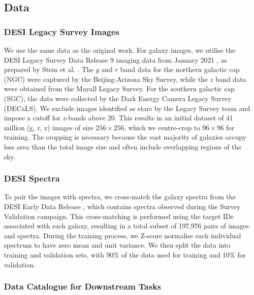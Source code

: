 \documentclass[a4paper,12pt]{article}
\begin{document}
\subsection{Data}
\label{sec:data}
\subsubsection{DESI Legacy Survey Images}
We use the same data as the original work. For galaxy images, we utilise the DESI Legacy Survey Data Release 9 imaging data from January 2021 \cite{DESI}, as prepared by Stein et al. \cite{stein}. The $g$ and $r$ band data for the northern galactic cap (NGC) were captured by the Beijing-Arizona Sky Survey, while the $z$ band data were obtained from the Mayall Legacy Survey. For the southern galactic cap (SGC), the data were collected by the Dark Energy Camera Legacy Survey (DECaLS). We exclude images identified as stars by the Legacy Survey team and impose a cutoff for $z$-bands above 20. This results in an initial dataset of 41 million (g, r, z) images of size $256 \times 256$, which we centre-crop to $96 \times 96$ for training. The cropping is necessary because the vast majority of galaxies occupy less area than the total image size and often include overlapping regions of the sky.


\subsubsection{DESI Spectra}
To pair the images with spectra, we cross-match the galaxy spectra from the DESI Early Data Release \cite{DESI2023}, which contains spectra observed during the Survey Validation campaign. This cross-matching is performed using the target IDs associated with each galaxy, resulting in a total subset of 197,976 pairs of images and spectra. During the training process, we Z-score normalise each individual spectrum to have zero mean and unit variance. We then split the data into training and validation sets, with 90\% of the data used for training and 10\% for validation.


\subsubsection{Data Catalogue for Downstream Tasks}
\end{document}
